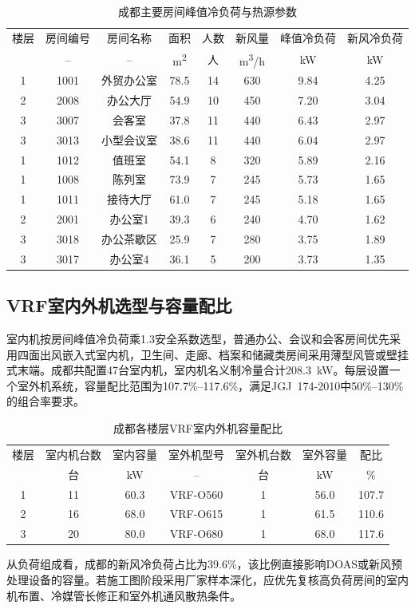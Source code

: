 \begin{table}[!htbp]
\centering
\caption{成都主要房间峰值冷负荷与热源参数}
\label{tab:chengdu-top-rooms}
\begin{tabular}{@{}cccccccc@{}}
\toprule
楼层 & 房间编号 & 房间名称 & 面积 & 人数 & 新风量 & 峰值冷负荷 & 新风冷负荷 \\
 & -- & -- & \si{m^2} & 人 & \si{m^3/h} & \si{kW} & \si{kW} \\
\midrule
1 & 1001 & 外贸办公室 & 78.5 & 14 & 630 & 9.84 & 4.25 \\
2 & 2008 & 办公大厅 & 54.9 & 10 & 450 & 7.20 & 3.04 \\
3 & 3007 & 会客室 & 37.8 & 11 & 440 & 6.43 & 2.97 \\
3 & 3013 & 小型会议室 & 38.6 & 11 & 440 & 6.04 & 2.97 \\
1 & 1012 & 值班室 & 54.1 & 8 & 320 & 5.89 & 2.16 \\
1 & 1008 & 陈列室 & 73.9 & 7 & 245 & 5.73 & 1.65 \\
1 & 1011 & 接待大厅 & 61.0 & 7 & 245 & 5.18 & 1.65 \\
2 & 2001 & 办公室1 & 39.3 & 6 & 240 & 4.70 & 1.62 \\
3 & 3018 & 办公茶歇区 & 25.9 & 7 & 280 & 3.75 & 1.89 \\
3 & 3017 & 办公室4 & 36.1 & 5 & 200 & 3.73 & 1.35 \\
\bottomrule
\end{tabular}
\end{table}

\subsection{VRF室内外机选型与容量配比}

室内机按房间峰值冷负荷乘1.3安全系数选型，普通办公、会议和会客房间优先采用四面出风嵌入式室内机，卫生间、走廊、档案和储藏类房间采用薄型风管或壁挂式末端。成都共配置47台室内机，室内机名义制冷量合计\SI{208.3}{kW}。每层设置一个室外机系统，容量配比范围为107.7\%--117.6\%，满足JGJ~174-2010中50\%--130\%的组合率要求。

\begin{table}[!htbp]
\centering
\caption{成都各楼层VRF室内外机容量配比}
\label{tab:chengdu-vrf-ratio}
\begin{tabular}{@{}ccccccc@{}}
\toprule
楼层 & 室内机台数 & 室内容量 & 室外机型号 & 室外机台数 & 室外容量 & 配比 \\
 & 台 & \si{kW} & -- & 台 & \si{kW} & \% \\
\midrule
1 & 11 & 60.3 & VRF-O560 & 1 & 56.0 & 107.7 \\
2 & 16 & 68.0 & VRF-O615 & 1 & 61.5 & 110.6 \\
3 & 20 & 80.0 & VRF-O680 & 1 & 68.0 & 117.6 \\
\bottomrule
\end{tabular}
\end{table}

从负荷组成看，成都的新风冷负荷占比为39.6\%，该比例直接影响DOAS或新风预处理设备的容量。若施工图阶段采用厂家样本深化，应优先复核高负荷房间的室内机布置、冷媒管长修正和室外机通风散热条件。
